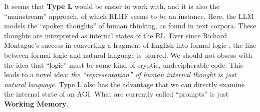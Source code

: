 \documentclass[runningheads]{llncs}
\begin{document}

It seems that \textbf{Type L} would be easier to work with, and it is also the ``mainstream'' approach, of which RLHF seems to be an instance.  Here, the LLM models the ``spoken thoughts'' of human thinking, as found in text corpora.  These thoughts are interpreted as internal states of the RL.  Ever since Richard Montague's success in converting a fragment of English into formal logic \cite{Montague}, the line between formal logic and natural language is blurred.  We should not obsess with the idea that ``logic'' must be some kind of cryptic, undecipherable code.  This leads to a novel idea: \textit{the ``representation'' of human internal thought is just natural language.}  Type L also has the advantage that we can directly examine the internal state of an AGI.  What are currently called ``prompts'' is just \textbf{Working Memory}.
\end{document}
